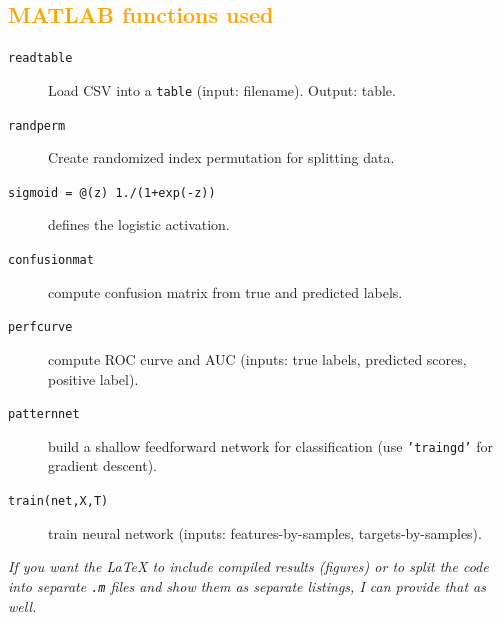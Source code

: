 \documentclass[11pt,a4paper]{article}
\begin{document}
\subsection{\textcolor{orange}{ MATLAB functions used }}
\begin{description}
  \item[\texttt{readtable}] Load CSV into a \texttt{table} (input: filename). Output: table.
  \item[\texttt{randperm}] Create randomized index permutation for splitting data.
  \item[\texttt{sigmoid = @(z) 1./(1+exp(-z))}] defines the logistic activation.
  \item[\texttt{confusionmat}] compute confusion matrix from true and predicted labels.
  \item[\texttt{perfcurve}] compute ROC curve and AUC (inputs: true labels, predicted scores, positive label).
  \item[\texttt{patternnet}] build a shallow feedforward network for classification (use \texttt{'traingd'} for gradient descent).
  \item[\texttt{train(net,X,T)}] train neural network (inputs: features-by-samples, targets-by-samples).
\end{description}


\bigskip



\vfill
\noindent\textit{If you want the LaTeX to include compiled results (figures) or to split the code into separate \texttt{.m} files and show them as separate listings, I can provide that as well.}
\end{document}
